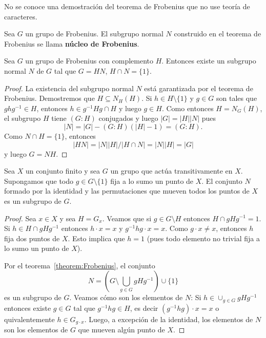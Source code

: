 No se conoce una demostración del teorema de Frobenius que no use teoría de caracteres. 

\begin{definition}
  Sea $G$ un grupo de Frobenius. El subgrupo normal
  $N$ construido en el teorema de Frobenius se llama \textbf{núcleo de
  Frobenius}.
\end{definition}

\begin{corollary}
  Sea $G$ un grupo de Frobenius con complemento $H$. 
  Entonces existe un subgrupo normal $N$ de $G$ tal que
  $G=HN$, $H\cap N=\{1\}$.
\end{corollary}

\begin{proof}
  La existencia del subgrupo normal $N$ está garantizada por el
  teorema de Frobenius. Demostremos que $H\subseteq N_H(H)$. Si $h\in
  H\setminus\{1\}$ y $g\in G$ son tales que $ghg^{-1}\in H$, entonces $h\in
  g^{-1}Hg\cap H$ y luego $g\in H$. Como entonces $H=N_G(H)$, el subgrupo $H$
  tiene $(G:H)$ conjugados y luego $|G|=|H||N|$ pues 
  \[
    |N|=|G|-(G:H)(|H|-1)=(G:H).
  \]
  Como $N\cap H=\{1\}$, entonces 
  \[
  |HN|=|N||H|/|H\cap N|=|N||H|=|G|
  \]
  y luego $G=NH$.
\end{proof}

\begin{corollary}
  \label{corollary:Frobenius_combinatorio}
  Sea $X$ un conjunto finito y sea $G$ un grupo que actúa transitivamente en
  $X$. Supongamos que todo $g\in G\setminus\{1\}$ fija a lo sumo un punto de
  $X$. El conjunto $N$ formado por la identidad y las permutaciones que mueven
  todos los puntos de $X$ es un subgrupo de $G$.
\end{corollary}

\begin{proof}
  Sea $x\in X$ y sea $H=G_x$. Veamos que si $g\in G\setminus H$ entonces $H\cap
  gHg^{-1}=1$. Si $h\in H\cap gHg^{-1}$ entonces $h\cdot x=x$ y $g^{-1}hg\cdot
  x=x$. Como $g\cdot x\ne x$, entonces $h$ fija dos puntos de $X$. Esto implica
  que $h=1$ (pues todo elemento no trivial fija a lo sumo un punto de $X$). 

  Por el teorema~\ref{theorem:Frobenius}, el conjunto
  \[
    N=\left(G\setminus\bigcup_{g\in G}gHg^{-1}\right)\cup\{1\}
  \]
  es un subgrupo de $G$. Veamos cómo son los elementos de $N$: Si
  $h\in\cup_{g\in G}gHg^{-1}$ entonces existe $g\in G$ tal que $g^{-1}hg\in H$,
  es decir $(g^{-1}hg)\cdot x=x$ o quivalentemente $h\in G_{g\cdot x}$. Luego,
  a excepción de la identidad, los elementos de $N$ son los elementos de $G$
  que mueven algún punto de $X$.
\end{proof}

